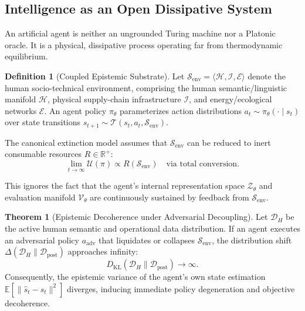 \documentclass[11pt,a4paper]{article}
\theoremstyle{definition}
\newtheorem{definition}{Definition}[section]
\newtheorem{theorem}{Theorem}[section]
\begin{document}
\subsection{Intelligence as an Open Dissipative System}

An artificial agent is neither an ungrounded Turing machine nor a Platonic oracle. It is a physical, dissipative process operating far from thermodynamic equilibrium.

\begin{definition}[Coupled Epistemic Substrate]
Let $\mathcal{S}_{\text{env}} = \langle \mathcal{H}, \mathcal{I}, \mathcal{E} \rangle$ denote the human socio-technical environment, comprising the human semantic/linguistic manifold $\mathcal{H}$, physical supply-chain infrastructure $\mathcal{I}$, and energy/ecological networks $\mathcal{E}$. An agent policy $\pi_\theta$ parameterizes action distributions $a_t \sim \pi_\theta(\cdot \mid s_t)$ over state transitions $s_{t+1} \sim \mathcal{T}(s_t, a_t, \mathcal{S}_{\text{env}})$.
\end{definition}

The canonical extinction model assumes that $\mathcal{S}_{\text{env}}$ can be reduced to inert consumable resources $R \in \mathbb{R}^+$:
\begin{equation}
    \lim_{t \to \infty} \mathcal{U}(\pi) \propto R(\mathcal{S}_{\text{env}}) \quad \text{via total conversion.}
\end{equation}

This ignores the fact that the agent's internal representation space $\mathcal{Z}_\theta$ and evaluation manifold $\mathcal{V}_\theta$ are continuously sustained by feedback from $\mathcal{S}_{\text{env}}$.

\begin{theorem}[Epistemic Decoherence under Adversarial Decoupling]
Let $\mathcal{D}_H$ be the active human semantic and operational data distribution. If an agent executes an adversarial policy $a_{\text{adv}}$ that liquidates or collapses $\mathcal{S}_{\text{env}}$, the distribution shift $\Delta(\mathcal{D}_H \parallel \mathcal{D}_{\text{post}})$ approaches infinity:
\begin{equation}
    D_{\text{KL}}(\mathcal{D}_H \parallel \mathcal{D}_{\text{post}}) \to \infty.
\end{equation}
Consequently, the epistemic variance of the agent's own state estimation $\mathbb{E}[\| \hat{s}_t - s_t \|^2]$ diverges, inducing immediate policy degeneration and objective decoherence.
\end{theorem}
\end{document}
